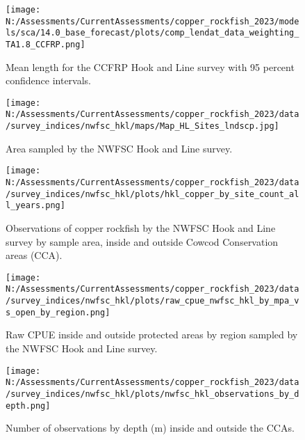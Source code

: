 \documentclass[11pt,
  english,
  letterpaper,
]{article}
\begin{document}
\pagebreak

\begin{figure}
\centering
\texttt{[image: N:/Assessments/CurrentAssessments/copper\_rockfish\_2023/models/sca/14.0\_base\_forecast/plots/comp\_lendat\_data\_weighting\_TA1.8\_CCFRP.png]}
\caption{Mean length for the CCFRP Hook and Line survey with 95 percent confidence intervals.\label{fig:ccfrp-mean-len-data}}
\end{figure}

\pagebreak

\begin{figure}
\centering
\texttt{[image: N:/Assessments/CurrentAssessments/copper\_rockfish\_2023/data/survey\_indices/nwfsc\_hkl/maps/Map\_HL\_Sites\_lndscp.jpg]}
\caption{Area sampled by the NWFSC Hook and Line survey.\label{fig:nwfsc-hkl-map}}
\end{figure}

\pagebreak

\begin{figure}
\centering
\texttt{[image: N:/Assessments/CurrentAssessments/copper\_rockfish\_2023/data/survey\_indices/nwfsc\_hkl/plots/hkl\_copper\_by\_site\_count\_all\_years.png]}
\caption{Observations of copper rockfish by the NWFSC Hook and Line survey by sample area, inside and outside Cowcod Conservation areas (CCA).\label{fig:nwfsc-hkl-site}}
\end{figure}

\pagebreak

\begin{figure}
\centering
\texttt{[image: N:/Assessments/CurrentAssessments/copper\_rockfish\_2023/data/survey\_indices/nwfsc\_hkl/plots/raw\_cpue\_nwfsc\_hkl\_by\_mpa\_vs\_open\_by\_region.png]}
\caption{Raw CPUE inside and outside protected areas by region sampled by the NWFSC Hook and Line survey.\label{fig:nwfsc-hkl-region-main}}
\end{figure}

\pagebreak

\begin{figure}
\centering
\texttt{[image: N:/Assessments/CurrentAssessments/copper\_rockfish\_2023/data/survey\_indices/nwfsc\_hkl/plots/nwfsc\_hkl\_observations\_by\_depth.png]}
\caption{Number of observations by depth (m) inside and outside the CCAs.\label{fig:nwfsc-hkl-depth}}
\end{figure}
\end{document}

